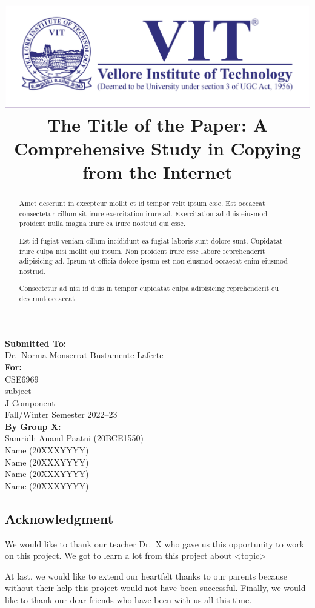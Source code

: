 \documentclass[14pt]{extarticle}
\date{}
\title{
    \includegraphics[width = \textwidth]{vit_logo.png}\\
    The Title of the Paper: A Comprehensive Study in Copying from the Internet
}
\author{}
\begin{document}
\maketitle
\begin{center}
    \textbf{Submitted To:}\\
    Dr.\ Norma Monserrat Bustamente Laferte\\
    \vspace{2em}
    \textbf{For:}\\
    CSE6969\\
    subject\\
    J-Component\\
    Fall/Winter Semester 2022--23\\
    \vspace{2em}
    \textbf{By Group X:}\\
    Samridh Anand Paatni (20BCE1550)\\
    Name (20XXXYYYY)\\
    Name (20XXXYYYY)\\
    Name (20XXXYYYY)\\
    Name (20XXXYYYY)
\end{center}

\newpage
\begin{abstract}
    Amet deserunt in excepteur mollit et id tempor velit ipsum esse. Est occaecat consectetur cillum sit irure exercitation irure ad. Exercitation ad duis eiusmod proident nulla magna irure ea irure nostrud qui esse.

    Est id fugiat veniam cillum incididunt ea fugiat laboris sunt dolore sunt. Cupidatat irure culpa nisi mollit qui ipsum. Non proident irure esse labore reprehenderit adipisicing ad. Ipsum ut officia dolore ipsum est non eiusmod occaecat enim eiusmod nostrud.

    Consectetur ad nisi id duis in tempor cupidatat culpa adipisicing reprehenderit eu deserunt occaecat.
\end{abstract}

\newpage
\begin{center}
    \section*{Acknowledgment}
\end{center}
We would like to thank our teacher Dr.\ X who gave us this opportunity to work on this project. We got to learn a lot from this project about <topic>

At last, we would like to extend our heartfelt thanks to our parents because without their help this project would not have been successful. Finally, we would like to thank our dear friends who have been with us all this time.
\end{document}
